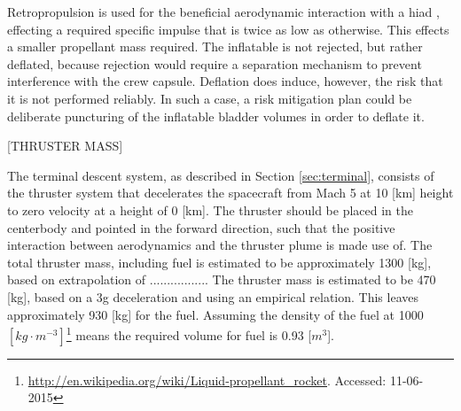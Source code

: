Retropropulsion is used for the beneficial aerodynamic interaction with a \gls{hiad} \cite{xxx}, effecting a required specific impulse that is twice as low as otherwise. This effects a smaller propellant mass required. The inflatable is not rejected, but rather deflated, because rejection would require a separation mechanism to prevent interference with the crew capsule. Deflation does induce, however, the risk that it is not performed reliably. In such a case, a risk mitigation plan could be deliberate puncturing of the inflatable bladder volumes in order to deflate it.

[THRUSTER MASS]


The terminal descent system, as described in Section \ref{sec:terminal}, consists of the thruster system that decelerates the spacecraft from Mach 5 at 10 [km] height to zero velocity at a height of 0 [km]. The thruster should be placed in the centerbody and pointed in the forward direction, such that the positive interaction between aerodynamics and the thruster plume is made use of. The total thruster mass, including fuel is estimated to be approximately 1300 [kg], based on extrapolation of .................
The thruster mass is estimated to be 470 [kg], based on a 3g deceleration and using an empirical relation\cite{Christian2006}. This leaves approximately 930 [kg] for the fuel. Assuming the density of the fuel at 1000 $[kg\cdot m^{-3}]$\footnote{\url{http://en.wikipedia.org/wiki/Liquid-propellant_rocket}. Accessed: 11-06-2015} means the required volume for fuel is 0.93 [$m^3$].